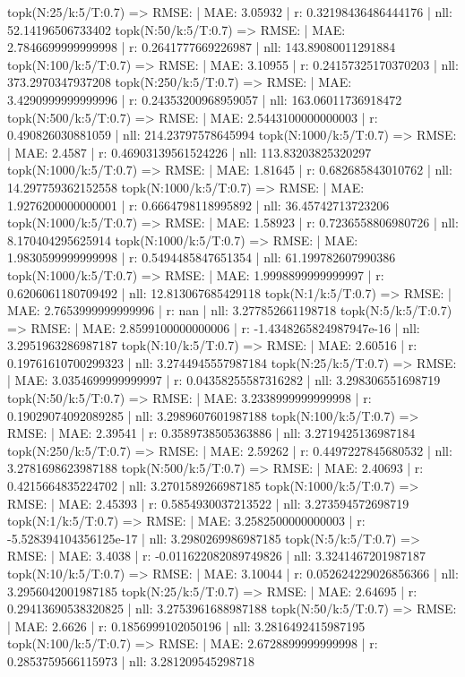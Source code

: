 topk(N:25/k:5/T:0.7) => RMSE: | MAE: 3.05932 | r: 0.32198436486444176 | nll: 52.14196506733402
topk(N:50/k:5/T:0.7) => RMSE: | MAE: 2.7846699999999998 | r: 0.2641777669226987 | nll: 143.89080011291884
topk(N:100/k:5/T:0.7) => RMSE: | MAE: 3.10955 | r: 0.24157325170370203 | nll: 373.2970347937208
topk(N:250/k:5/T:0.7) => RMSE: | MAE: 3.4290999999999996 | r: 0.24353200968959057 | nll: 163.06011736918472
topk(N:500/k:5/T:0.7) => RMSE: | MAE: 2.5443100000000003 | r: 0.490826030881059 | nll: 214.23797578645994
topk(N:1000/k:5/T:0.7) => RMSE: | MAE: 2.4587 | r: 0.46903139561524226 | nll: 113.83203825320297
topk(N:1000/k:5/T:0.7) => RMSE: | MAE: 1.81645 | r: 0.682685843010762 | nll: 14.297759362152558
topk(N:1000/k:5/T:0.7) => RMSE: | MAE: 1.9276200000000001 | r: 0.6664798118995892 | nll: 36.45742713723206
topk(N:1000/k:5/T:0.7) => RMSE: | MAE: 1.58923 | r: 0.7236558806980726 | nll: 8.170404295625914
topk(N:1000/k:5/T:0.7) => RMSE: | MAE: 1.9830599999999998 | r: 0.5494485847651354 | nll: 61.199782607990386
topk(N:1000/k:5/T:0.7) => RMSE: | MAE: 1.9998899999999997 | r: 0.6206061180709492 | nll: 12.813067685429118
topk(N:1/k:5/T:0.7) => RMSE: | MAE: 2.7653999999999996 | r: nan | nll: 3.277852661198718
topk(N:5/k:5/T:0.7) => RMSE: | MAE: 2.8599100000000006 | r: -1.4348265824987947e-16 | nll: 3.2951963286987187
topk(N:10/k:5/T:0.7) => RMSE: | MAE: 2.60516 | r: 0.19761610700299323 | nll: 3.2744945557987184
topk(N:25/k:5/T:0.7) => RMSE: | MAE: 3.0354699999999997 | r: 0.04358255587316282 | nll: 3.298306551698719
topk(N:50/k:5/T:0.7) => RMSE: | MAE: 3.2338999999999998 | r: 0.19029074092089285 | nll: 3.2989607601987188
topk(N:100/k:5/T:0.7) => RMSE: | MAE: 2.39541 | r: 0.3589738505363886 | nll: 3.2719425136987184
topk(N:250/k:5/T:0.7) => RMSE: | MAE: 2.59262 | r: 0.4497227845680532 | nll: 3.2781698623987188
topk(N:500/k:5/T:0.7) => RMSE: | MAE: 2.40693 | r: 0.4215664835224702 | nll: 3.2701589266987185
topk(N:1000/k:5/T:0.7) => RMSE: | MAE: 2.45393 | r: 0.5854930037213522 | nll: 3.273594572698719
topk(N:1/k:5/T:0.7) => RMSE: | MAE: 3.2582500000000003 | r: -5.528394104356125e-17 | nll: 3.2980269986987185
topk(N:5/k:5/T:0.7) => RMSE: | MAE: 3.4038 | r: -0.011622082089749826 | nll: 3.3241467201987187
topk(N:10/k:5/T:0.7) => RMSE: | MAE: 3.10044 | r: 0.052624229026856366 | nll: 3.2956042001987185
topk(N:25/k:5/T:0.7) => RMSE: | MAE: 2.64695 | r: 0.29413690538320825 | nll: 3.2753961688987188
topk(N:50/k:5/T:0.7) => RMSE: | MAE: 2.6626 | r: 0.1856999102050196 | nll: 3.2816492415987195
topk(N:100/k:5/T:0.7) => RMSE: | MAE: 2.6728899999999998 | r: 0.2853759566115973 | nll: 3.281209545298718
